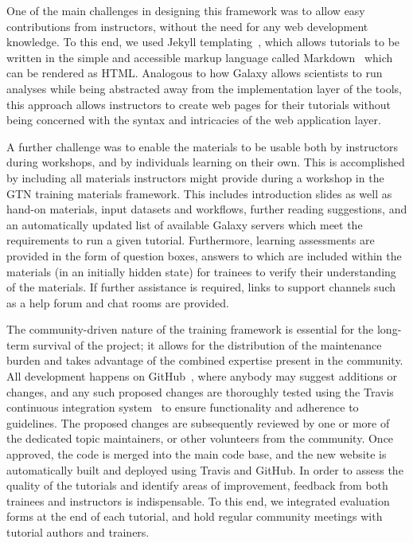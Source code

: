 One of the main challenges in designing this framework was to allow easy contributions from instructors, without the need for any web development knowledge. To this end, we used Jekyll templating~\cite{url-jekyll}, which allows tutorials to be written in the simple and accessible markup language called Markdown~\cite{url-markdown} which can be rendered as HTML\@. Analogous to how Galaxy allows scientists to run analyses while being abstracted away from the implementation layer of the tools, this approach allows instructors to create web pages for their tutorials without being concerned with the syntax and intricacies of the web application layer.

A further challenge was to enable the materials to be usable both by instructors during workshops, and by individuals learning on their own. This is accomplished by including all materials instructors might provide during a workshop in the GTN training materials framework. This includes introduction slides as well as hand-on materials, input datasets and workflows, further reading suggestions, and an automatically updated list of available Galaxy servers which meet the requirements to run a given tutorial. Furthermore, learning assessments are provided in the form of question boxes, answers to which are included within the materials (in an initially hidden state) for trainees to verify their understanding of the materials. If further assistance is required, links to support channels such as a help forum and chat rooms are provided.

The community-driven nature of the training framework is essential for the long-term survival of the project; it allows for the distribution of the maintenance burden and takes advantage of the combined expertise present in the community. All development happens on GitHub~\cite{url-github}, where anybody may suggest additions or changes, and any such proposed changes are thoroughly tested using the Travis continuous integration system~\cite{travis-ci} to ensure functionality and adherence to guidelines. The proposed changes are subsequently reviewed by one or more of the dedicated topic maintainers, or other volunteers from the community. Once approved, the code is merged into the main code base, and the new website is automatically built and deployed using Travis and GitHub. In order to assess the quality of the tutorials and identify areas of improvement, feedback from both trainees and instructors is indispensable. To this end, we integrated evaluation forms at the end of each tutorial, and hold regular community meetings with tutorial authors and trainers.

